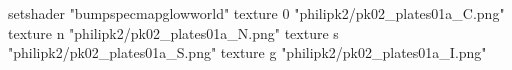 setshader "bumpspecmapglowworld"
    texture 0 "philipk2/pk02_plates01a_C.png"
    texture n "philipk2/pk02_plates01a_N.png"
    texture s "philipk2/pk02_plates01a_S.png"
    texture g "philipk2/pk02_plates01a_I.png"